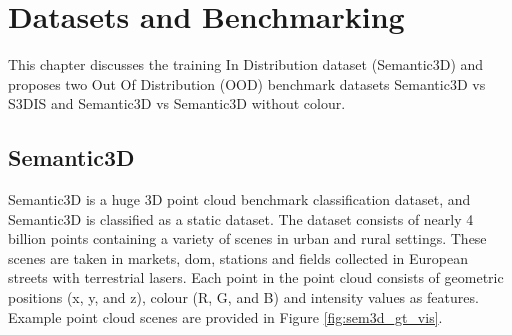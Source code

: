 

    \chapter{Datasets and Benchmarking}
    \label{ch:benchmark}
    This chapter discusses the training In Distribution dataset (Semantic3D) and proposes two Out Of Distribution (OOD) benchmark datasets Semantic3D vs S3DIS and Semantic3D vs Semantic3D without colour.
    \section{Semantic3D}
    \label{sec:dataset_sem3d}
    Semantic3D is a huge 3D  point cloud benchmark classification dataset, and Semantic3D is classified as a static dataset.
    The dataset consists of nearly 4 billion points containing a variety of scenes in urban and rural settings.
    These scenes are taken in markets, dom, stations and fields collected in European streets with terrestrial lasers.
    Each point in the point cloud consists of geometric positions (x, y, and z), colour (R, G, and B) and intensity values as features.
    Example point cloud scenes are provided in Figure \ref{fig:sem3d_gt_vis}. 
    
